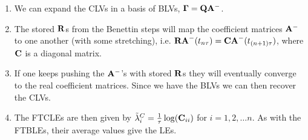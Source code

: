 \begin{enumerate}
\setcounter{enumi}{\value{algo}}
\item We can expand the CLVs in a basis of BLVs, $\vb{\Gamma} = \vb{Q A^-}$.
\item The stored $\vb{R}$s from the Benettin steps will map the coefficient matrices $\vb{A}^-$ to one another (with some stretching), i.e. $\vb{R A}^- (t_{n \tau}) = \vb{C A}^- (t_{(n+1) \tau})$, where $\vb{C}$ is a diagonal matrix.
\item If one keeps pushing the $\vb{A}^-$'s with stored $\vb{R}$s they will eventually converge to the real coefficient matrices. Since we have the BLVs we can then recover the CLVs.
\item The FTCLEs are then given by $\tilde{\lambda}_i ^C = \frac{1}{\tau} \log(\vb{C}_{ii})$ for $i = 1, 2, \ldots n$. As with the FTBLEs, their average values give the LEs.
\end{enumerate}
